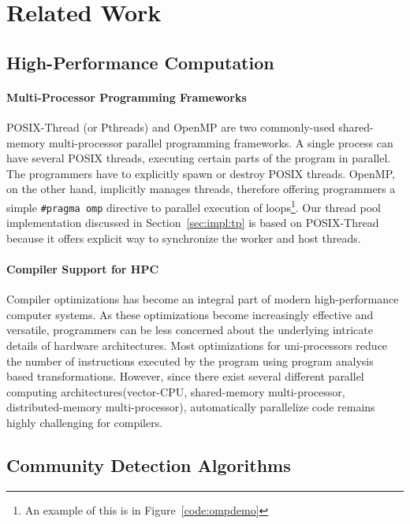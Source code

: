 \section{Related Work}

\subsection{High-Performance Computation}

\paragraph{Multi-Processor Programming Frameworks} POSIX-Thread\citep{pthread}
(or Pthreads) and OpenMP\citep{openmp} are two commonly-used shared-memory 
multi-processor parallel programming frameworks.  A single process can have 
several POSIX threads, executing certain parts of the program in 
parallel. The programmers have to explicitly spawn or destroy POSIX threads.
OpenMP, on the other hand, implicitly manages threads, therefore
offering programmers a simple \texttt{\#pragma omp} directive to parallel execution of 
loops\footnote{An example of this is in Figure~\ref{code:ompdemo}}.
Our thread pool implementation discussed in Section~\ref{sec:impl:tp}
is based on POSIX-Thread because it offers explicit way to 
synchronize the worker and host threads.

\paragraph{Compiler Support for HPC} Compiler optimizations  has become an
integral part of modern high-performance computer systems. As these 
optimizations become increasingly effective and versatile, programmers
can be less concerned about the underlying intricate details of hardware
architectures. Most optimizations for uni-processors reduce the number of
instructions executed by the program using program analysis based 
transformations\citep{compiler-for-hpc}. However, since there exist several
different parallel computing architectures(vector-CPU, shared-memory
multi-processor, distributed-memory multi-processor), automatically 
parallelize code remains highly challenging for compilers.


\subsection{Community Detection Algorithms}

